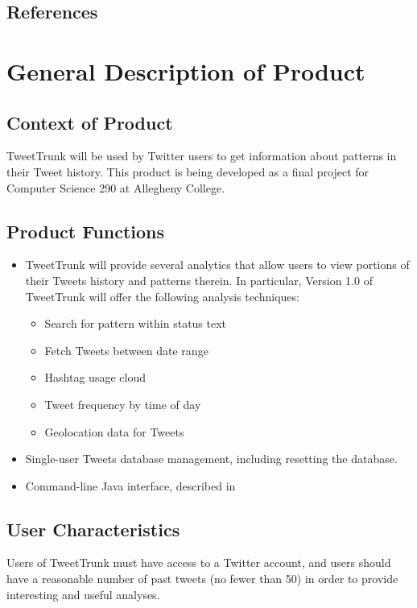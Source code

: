 \documentclass[a4paper, 12pt]{article}
\begin{document}
\subsection{References}



\section{General Description of Product}

\subsection{Context of Product}
TweetTrunk will be used by Twitter users to get information about patterns in their Tweet history. This product is being developed as a final project for Computer Science 290 at Allegheny College.

\subsection{Product Functions}
\label{sec:prod-func}
\begin{itemize}
\item TweetTrunk will provide several analytics that allow users to view portions of their Tweets history and patterns therein.
In particular, Version 1.0 of TweetTrunk will offer the following analysis techniques:
\begin{itemize}
\item Search for pattern within status text
\item Fetch Tweets between date range
\item Hashtag usage cloud
\item Tweet frequency by time of day
\item Geolocation data for Tweets
\end{itemize}
\item Single-user Tweets database management, including resetting the database.
\item Command-line Java interface, described in~
\end{itemize}

\subsection{User Characteristics}
Users of TweetTrunk must have access to a Twitter account, and users should have a reasonable number of past tweets (no fewer than 50) in order to provide interesting and useful analyses.
\end{document}
